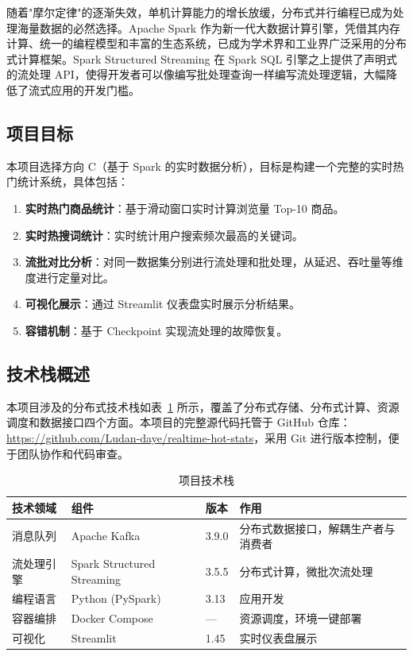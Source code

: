 \documentclass[12pt,a4paper]{article}
\begin{document}
随着"摩尔定律"的逐渐失效，单机计算能力的增长放缓，分布式并行编程已成为处理海量数据的必然选择\cite{dean2004}。Apache Spark 作为新一代大数据计算引擎，凭借其内存计算、统一的编程模型和丰富的生态系统，已成为学术界和工业界广泛采用的分布式计算框架\cite{zaharia2016}。Spark Structured Streaming 在 Spark SQL 引擎之上提供了声明式的流处理 API，使得开发者可以像编写批处理查询一样编写流处理逻辑，大幅降低了流式应用的开发门槛\cite{armbrust2018}。

\subsection{项目目标}

本项目选择方向 C（基于 Spark 的实时数据分析），目标是构建一个完整的实时热门统计系统，具体包括：

\begin{enumerate}    \item \textbf{实时热门商品统计}：基于滑动窗口实时计算浏览量 Top-10 商品。
    \item \textbf{实时热搜词统计}：实时统计用户搜索频次最高的关键词。
    \item \textbf{流批对比分析}：对同一数据集分别进行流处理和批处理，从延迟、吞吐量等维度进行定量对比。
    \item \textbf{可视化展示}：通过 Streamlit 仪表盘实时展示分析结果。
    \item \textbf{容错机制}：基于 Checkpoint 实现流处理的故障恢复。
\end{enumerate}

\subsection{技术栈概述}

本项目涉及的分布式技术栈如表~\ref{tab:tech-stack} 所示，覆盖了分布式存储、分布式计算、资源调度和数据接口四个方面。本项目的完整源代码托管于 GitHub 仓库：\url{https://github.com/Ludan-daye/realtime-hot-stats}，采用 Git 进行版本控制，便于团队协作和代码审查。

\begin{table}[H]
\centering
\caption{项目技术栈}
\label{tab:tech-stack}
\begin{tabular}{llll}
\toprule
\textbf{技术领域} & \textbf{组件} & \textbf{版本} & \textbf{作用} \\
\midrule
消息队列 & Apache Kafka & 3.9.0 & 分布式数据接口，解耦生产者与消费者 \\
流处理引擎 & Spark Structured Streaming & 3.5.5 & 分布式计算，微批次流处理 \\
编程语言 & Python (PySpark) & 3.13 & 应用开发 \\
容器编排 & Docker Compose & — & 资源调度，环境一键部署 \\
可视化 & Streamlit & 1.45 & 实时仪表盘展示 \\
\bottomrule
\end{tabular}
\end{table}
\end{document}
